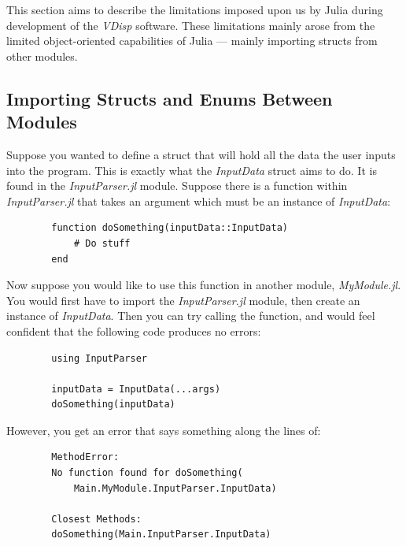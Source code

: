 \documentclass[11pt,fleqn]{article}
\newcommand{\indentpar}{\phantom{=}}
\begin{document}
    \indentpar This section aims to describe the limitations imposed
    upon us by Julia during development of the \emph{VDisp} software.
    These limitations mainly arose from the limited object-oriented capabilities
    of Julia — mainly importing structs from other modules.

    \subsection*{Importing Structs and Enums Between Modules}


        \indentpar Suppose you wanted to define a struct that will hold all the 
        data the user inputs into the program. This is exactly what the \emph{InputData}
        struct aims to do. It is found in the \emph{InputParser.jl} module. Suppose 
        there is a function within \emph{InputParser.jl} that takes an argument which
        must be an instance of \emph{InputData}:
        
        \begin{verbatim}
        function doSomething(inputData::InputData)
            # Do stuff
        end
        \end{verbatim}

        \indentpar Now suppose you would like to use this function in another module,
        \emph{MyModule.jl}. You would first have to import the \emph{InputParser.jl}
        module, then create an instance of \emph{InputData}. Then you can try calling
        the function, and would feel confident that the following code produces no errors:

        \begin{verbatim}
        using InputParser

        inputData = InputData(...args)
        doSomething(inputData)
        \end{verbatim}

        \indentpar However, you get an error that says something along the lines of:

        \begin{verbatim}
        MethodError: 
        No function found for doSomething(
            Main.MyModule.InputParser.InputData)

        Closest Methods:
        doSomething(Main.InputParser.InputData)
        \end{verbatim}
\end{document}

